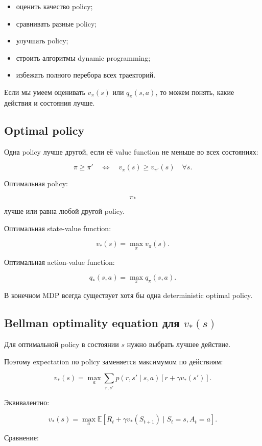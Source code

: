 \documentclass[a4paper,12pt]{article}
\begin{document}
\begin{itemize}
    \item оценить качество policy;
    \item сравнивать разные policy;
    \item улучшать policy;
    \item строить алгоритмы dynamic programming;
    \item избежать полного перебора всех траекторий.
\end{itemize}

Если мы умеем оценивать \(v_\pi(s)\) или \(q_\pi(s,a)\), то можем понять, какие действия и состояния лучше.

\subsection{Optimal policy}

Одна policy лучше другой, если её value function не меньше во всех состояниях:

\[
\pi \geq \pi'
\quad \Longleftrightarrow \quad
v_\pi(s) \geq v_{\pi'}(s)
\quad \forall s.
\]

Оптимальная policy:

\[
\pi_*
\]

лучше или равна любой другой policy.

Оптимальная state-value function:

\[
v_*(s)
=
\max_\pi v_\pi(s).
\]

Оптимальная action-value function:

\[
q_*(s,a)
=
\max_\pi q_\pi(s,a).
\]

В конечном MDP всегда существует хотя бы одна deterministic optimal policy.

\subsection{Bellman optimality equation для \(v_*(s)\)}

Для оптимальной policy в состоянии \(s\) нужно выбрать лучшее действие.

Поэтому expectation по policy заменяется максимумом по действиям:

\[
v_*(s)
=
\max_a
\sum_{r,s'}
p(r,s'\mid s,a)
\left[
r + \gamma v_*(s')
\right].
\]

Эквивалентно:

\[
v_*(s)
=
\max_a
\mathbb{E}
[
R_t + \gamma v_*(S_{t+1})
\mid S_t=s, A_t=a
].
\]

Сравнение:
\end{document}
